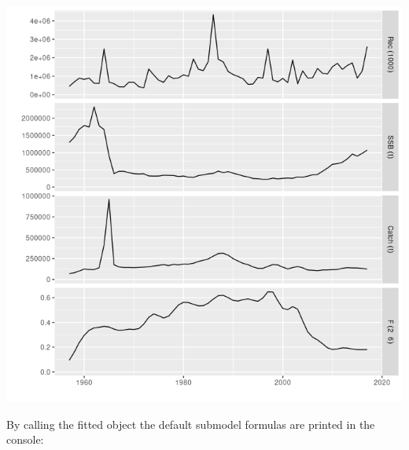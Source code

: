 \documentclass[a4paper,english,11pt]{article}
\begin{document}

\begin{knitrout}
\color{fgcolor}\begin{kframe}
\begin{alltt}
 \hlkwb{<-} 
 \hlkwb{<-}  \hlopt{+} 
\end{alltt}
\end{kframe}

{\centering \includegraphics[width=.9\linewidth]{figure/unnamed-chunk-4-1} 

}


\end{knitrout}

By calling the fitted object the default submodel formulas are printed in the console:
\end{document}
